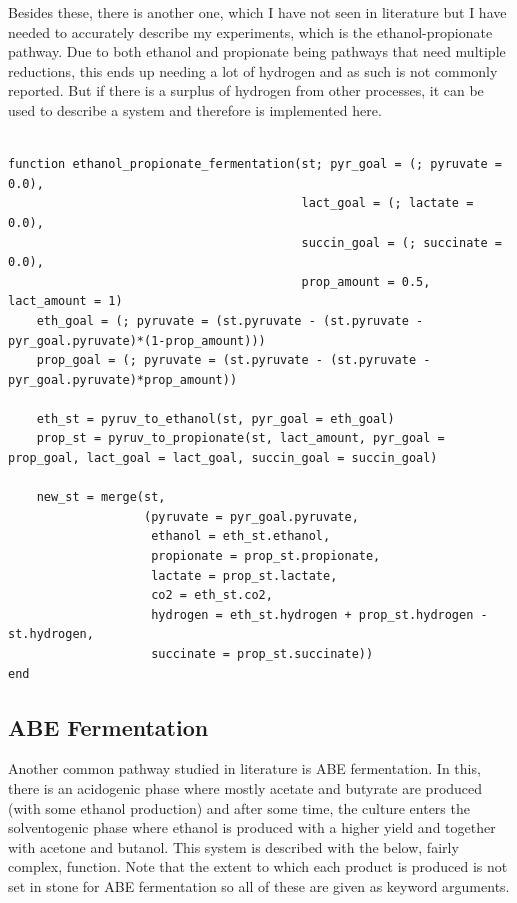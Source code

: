 \documentclass[11pt]{article}
\begin{document}
Besides these, there is another one, which I have not seen in literature but I have needed to accurately describe my experiments, which is the ethanol-propionate pathway. Due to both ethanol and propionate being pathways that need multiple reductions, this ends up needing a lot of hydrogen and as such is not commonly reported. But if there is a surplus of hydrogen from other processes, it can be used to describe a system and therefore is implemented here.

\begin{verbatim}

function ethanol_propionate_fermentation(st; pyr_goal = (; pyruvate = 0.0),
                                         lact_goal = (; lactate = 0.0),
                                         succin_goal = (; succinate = 0.0),
                                         prop_amount = 0.5, lact_amount = 1)
    eth_goal = (; pyruvate = (st.pyruvate - (st.pyruvate - pyr_goal.pyruvate)*(1-prop_amount)))
    prop_goal = (; pyruvate = (st.pyruvate - (st.pyruvate - pyr_goal.pyruvate)*prop_amount))

    eth_st = pyruv_to_ethanol(st, pyr_goal = eth_goal)
    prop_st = pyruv_to_propionate(st, lact_amount, pyr_goal = prop_goal, lact_goal = lact_goal, succin_goal = succin_goal)

    new_st = merge(st,
                   (pyruvate = pyr_goal.pyruvate,
                    ethanol = eth_st.ethanol,
                    propionate = prop_st.propionate,
                    lactate = prop_st.lactate,
                    co2 = eth_st.co2,
                    hydrogen = eth_st.hydrogen + prop_st.hydrogen - st.hydrogen,
                    succinate = prop_st.succinate))
end

\end{verbatim}

\subsection{ABE Fermentation}
\label{sec:orge636528}
Another common pathway studied in literature is ABE fermentation. In this, there is an acidogenic phase where mostly acetate and butyrate are produced (with some ethanol production) and after some time, the culture enters the solventogenic phase where ethanol is produced with a higher yield and together with acetone and butanol. This system is described with the below, fairly complex, function. Note that the extent to which each product is produced is not set in stone for ABE fermentation so all of these are given as keyword arguments.
\end{document}
